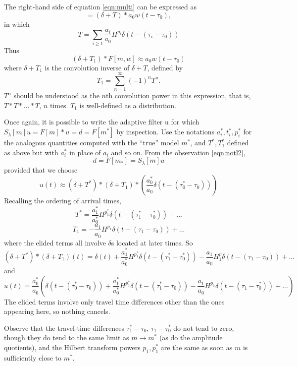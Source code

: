 The right-hand side of equation \ref{eqn:multi} can be expressed as
\[
  = (\delta + T) * a_0w(t-\tau_0),
\]
in which 
\[
  T = \sum_{i \ge 1}
  \frac{a_i}{a_0}H^{p_i}\delta(t-(\tau_i-\tau_0))
\]
Thus
\begin{equation}
  \label{eqn:unwrap}
  (\delta +T_1) * F[m,w] \approx  a_0w(t-\tau_0)
\end{equation}
where $\delta + T_1$ is the convolution inverse of $\delta + T$,
defined by 
\[
  T_1 = \sum_{n=1}^{\infty} (-1)^n T^n.
\]
$T^n$ should be understood as the $n$th convolution power in this
expression, that is, $T*T*...*T$, $n$ times. $T_1$ is well-defined as a distribution.

Once again, it is possible to write the adaptive filter u for which $S_{\lambda}[m]u = F[m]*u = d =
F[m^*]$ by inspection. Use the notations $a^*_i, t^*_i, p^*_i$ for
the analogous quantities computed with the ``true'' model $m^*$, and
$T^*, T_1^*$ defined as above but with $a^*_i$ in place of $a_i$ and so
on. From the observation \ref{eqn:notl2},
\[
  d = F[m_*]= S_{\lambda}[m]u
\]
provided that we choose
\begin{equation}
  \label{eqn:notl2again}
u(t) \approx (\delta + T^*)*(\delta +
T_1)*\left(\frac{a^*_0}{a_0}\delta(t - (\tau^*_0-\tau_0))\right)
\end{equation}
Recalling the ordering of arrival times, 
\[
  T^* = \frac{a^*_1}{a^*_0}H^{p_1^*} \delta(t-(\tau^*_1-\tau^*_0)) + ...
\]
\[
  T_1 = -\frac{a_1}{a_0}H^{p_1} \delta(t-(\tau_1-\tau_0)) + ...
\]
where the elided terms all involve $\delta$s located at later times.
So
\[
  (\delta + T^*)*(\delta + T_1)(t) = \delta(t)  +  \frac{a^*_1}{a^*_0}
  H^{p_1^*}\delta(t-(\tau^*_1-\tau^*_0)) -\frac{a_1}{a_0}H^p_1
  \delta(t-(\tau_1-\tau_0)) + ...
\]
and
\begin{equation}
  \label{eqn:notl2explicit}
  u(t) = \frac{a^*_0}{a_0}\left(\delta(t - (\tau^*_0-\tau_0)) +
    \frac{a^*_1}{a^*_0}H^{p_1^*}\delta(t-(\tau^*_1-\tau_0)) -
    \frac{a_1}{a_0}H^{p_1}\delta(t-(\tau_1-\tau_0^*)) + ...\right)
\end{equation}
The elided terms involve only travel time differences other than the
ones appearing here, so nothing cancels.

Observe that the travel-time differences $\tau^*_1-\tau_0$,
$\tau_1-\tau_0^*$ do not tend to zero, though they do tend to the same
limit as $m \rightarrow m^*$ (as do the amplitude quotients), and the
Hilbert transform powers $p_1, p_1^*$ are the same as soon as $m$ is
sufficiently close to $m^*$.

